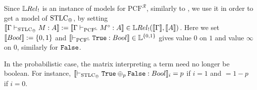 Since $\LREL_!$ is an instance of models for $\mathrm{PCF}^{\mathcal{R}}$, similarly to \cite[Section VI]{Manzo2013}, we use it in order to get a model of $\mathrm{STLC}_\oplus$, by setting $\model{\Gamma \vdash_{\STLC_\oplus} M:A}:=\model{\Gamma \vdash_{\mathrm{PCF}^{\Lawv}} M^\circ:A}\in\HOM{\LREL_!}{\model{\Gamma}}{\model{A}}$.
Here we set $\model{\bool}:=\{0,1\}$ and $\model{\vdash_{\mathrm{PCF}^{\Lawv}} \true:\bool}\in\Lawv^{\{0,1\}}$ gives value $0$ on $1$ and value $\infty$ on $0$, similarly for $\mathtt{False}$.

\begin{remark}
 In the probabilistic case, the matrix interpreting a term need no longer be boolean.
 For instance, $\model{\vdash_{\STLC_\oplus} \true\oplus_p\false :\bool}_i=p$ if $i=1$ and $=1-p$ if $i=0$.
\end{remark}

